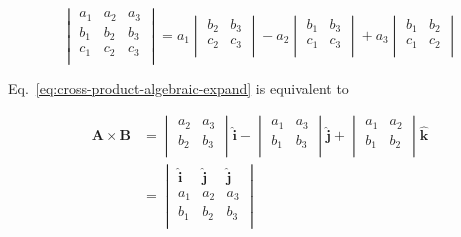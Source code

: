 \begin{equation}
    \begin{vmatrix}
        a_1 & a_2 & a_3 \\
        b_1 & b_2 & b_3 \\
        c_1 & c_2 & c_3 \\
    \end{vmatrix} =
    a_1 \begin{vmatrix}
        b_2 & b_3 \\
        c_2 & c_3 \\
    \end{vmatrix} -
    a_2 \begin{vmatrix}
        b_1 & b_3 \\
        c_1 & c_3 \\
    \end{vmatrix} +
    a_3 \begin{vmatrix}
        b_1 & b_2 \\
        c_1 & c_2 \\
    \end{vmatrix}
\end{equation}

Eq.~\ref{eq:cross-product-algebraic-expand} is equivalent to

\begin{align}
    \boldsymbol{A} \times \boldsymbol{B} &=
    \begin{vmatrix}
        a_2 & a_3 \\
        b_2 & b_3 \\
    \end{vmatrix} \boldsymbol{\hat{i}} -
    \begin{vmatrix}
        a_1 & a_3 \\
        b_1 & b_3 \\
    \end{vmatrix} \boldsymbol{\hat{j}} +
    \begin{vmatrix}
        a_1 & a_2 \\
        b_1 & b_2 \\
    \end{vmatrix} \boldsymbol{\hat{k}} \\ &=
    \begin{vmatrix}
        \boldsymbol{\hat{i}} & \boldsymbol{\hat{j}} & \boldsymbol{\hat{j}} \\
        a_1 & a_2 & a_3 \\
        b_1 & b_2 & b_3 \\
    \end{vmatrix} \label{eq:cross-product-algebraic-form}
\end{align}

